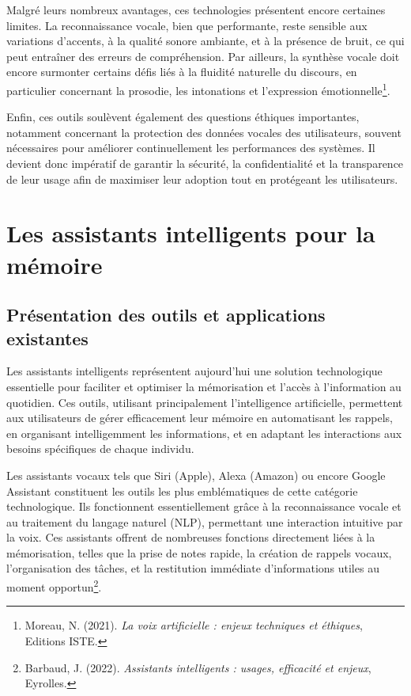\documentclass[11pt,a4paper]{report}
\begin{document}
Malgré leurs nombreux avantages, ces technologies présentent encore certaines limites. La reconnaissance vocale, bien que performante, reste sensible aux variations d’accents, à la qualité sonore ambiante, et à la présence de bruit, ce qui peut entraîner des erreurs de compréhension. Par ailleurs, la synthèse vocale doit encore surmonter certains défis liés à la fluidité naturelle du discours, en particulier concernant la prosodie, les intonations et l’expression émotionnelle\footnote{Moreau, N. (2021). \textit{La voix artificielle : enjeux techniques et éthiques}, Editions ISTE.}.

Enfin, ces outils soulèvent également des questions éthiques importantes, notamment concernant la protection des données vocales des utilisateurs, souvent nécessaires pour améliorer continuellement les performances des systèmes. Il devient donc impératif de garantir la sécurité, la confidentialité et la transparence de leur usage afin de maximiser leur adoption tout en protégeant les utilisateurs.

\section{Les assistants intelligents pour la mémoire}

\subsection{Présentation des outils et applications existantes}

Les assistants intelligents représentent aujourd’hui une solution technologique essentielle pour faciliter et optimiser la mémorisation et l'accès à l’information au quotidien. Ces outils, utilisant principalement l’intelligence artificielle, permettent aux utilisateurs de gérer efficacement leur mémoire en automatisant les rappels, en organisant intelligemment les informations, et en adaptant les interactions aux besoins spécifiques de chaque individu.

Les assistants vocaux tels que Siri (Apple), Alexa (Amazon) ou encore Google Assistant constituent les outils les plus emblématiques de cette catégorie technologique. Ils fonctionnent essentiellement grâce à la reconnaissance vocale et au traitement du langage naturel (NLP), permettant une interaction intuitive par la voix. Ces assistants offrent de nombreuses fonctions directement liées à la mémorisation, telles que la prise de notes rapide, la création de rappels vocaux, l’organisation des tâches, et la restitution immédiate d'informations utiles au moment opportun\footnote{Barbaud, J. (2022). \textit{Assistants intelligents : usages, efficacité et enjeux}, Eyrolles.}.
\end{document}
